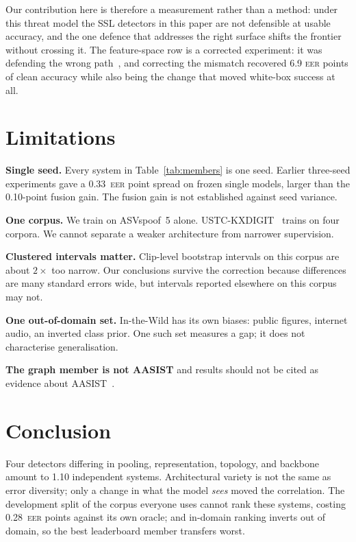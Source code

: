 \documentclass{llncs}
\newcommand{\eer}{\textsc{eer}}
\begin{document}
Our contribution here is therefore a measurement rather than a method: under this
threat model the SSL detectors in this paper are not defensible at usable accuracy,
and the one defence that addresses the right surface shifts the frontier without
crossing it.  The feature-space row is a corrected experiment: it was defending
the wrong path~\cite{madry2018}, and correcting the mismatch recovered 6.9 \eer{}
points of clean accuracy while also being the change that moved white-box success
at all.

\section{Limitations}
\label{sec:limit}

\textbf{Single seed.}  Every system in Table~\ref{tab:members} is one seed.
Earlier three-seed experiments gave a 0.33~\eer{} point spread on frozen single
models, larger than the 0.10-point fusion gain.  The fusion gain is not established
against seed variance.

\textbf{One corpus.}  We train on ASVspoof~5 alone.  USTC-KXDIGIT~\cite{ustc2024}
trains on four corpora.  We cannot separate a weaker architecture from narrower
supervision.

\textbf{Clustered intervals matter.}  Clip-level bootstrap intervals on this
corpus are about $2\times$ too narrow.  Our conclusions survive the correction
because differences are many standard errors wide, but intervals reported elsewhere
on this corpus may not.

\textbf{One out-of-domain set.}  In-the-Wild has its own biases: public figures,
internet audio, an inverted class prior.  One such set measures a gap; it does not
characterise generalisation.

\textbf{The graph member is not AASIST} and results should not be cited as
evidence about AASIST~\cite{aasist}.

\section{Conclusion}
\label{sec:conclusion}

Four detectors differing in pooling, representation, topology, and backbone amount
to 1.10 independent systems.  Architectural variety is not the same as error
diversity; only a change in what the model \emph{sees} moved the correlation.
The development split of the corpus everyone uses cannot rank these systems,
costing 0.28~\eer{} points against its own oracle; and in-domain ranking inverts
out of domain, so the best leaderboard member transfers worst.
\end{document}

